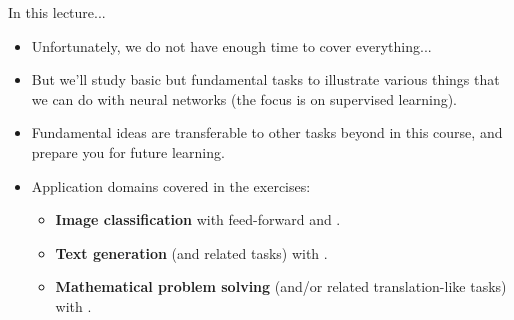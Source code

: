\begin{frame}{In this lecture...}
\vsp
\begin{itemize}
\item Unfortunately, we do not have enough time to cover everything...
\item But we'll study basic but fundamental tasks to illustrate various things that we can do with neural networks (the focus is on supervised learning).
\item Fundamental ideas are transferable to other tasks beyond in this course, and prepare you for future learning.
\item Application domains covered in the exercises:
\begin{itemize}
\item \textbf{Image classification} with feed-forward and .
\item \textbf{Text generation} (and related tasks) with .
\item \textbf{Mathematical problem solving} (and/or related translation-like tasks) with .
\end{itemize}
\end{itemize}
%
\end{frame}


%

